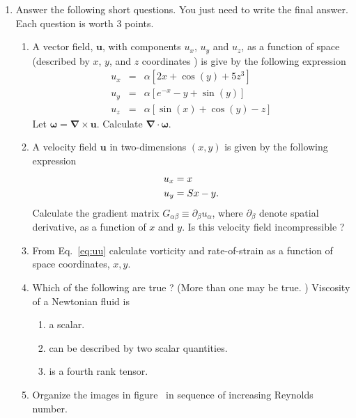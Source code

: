 \documentclass[12pt,a4paper]{article}
\def \oo {\bm{\omega}}
\def \curl {\bm{\nabla}\times}
\def \dive {\bm{\nabla}\cdot}
\newcommand{\bu}{\bm{u}}
\begin{document}
\begin{enumerate}

\item \label{prb1} Answer the following short questions. You just need to write the final answer. Each question is worth 3 points. 
  \begin{enumerate}
  \item A vector field, $\bu$, with components $u_x$, $u_y$ and $u_z$,  as a function  of
    space (described by $x$, $y$, and $z$ coordinates )
    is give by the following expression
    \begin{eqnarray}
      u_x &=& \alpha [2x + \cos(y) + 5z^3 ] \nonumber \\
      u_y &=& \alpha[ e^{-x} - y + \sin(y) ] \nonumber \\
      u_z &=& \alpha[ \sin(x) + \cos(y) -z ]
    \end{eqnarray}
   Let $\oo = \curl \bu$. Calculate $\dive \oo$. 
 \item A velocity field $\bu$ in two-dimensions $(x,y)$ is given by the following expression
   \begin{subequations}
     \begin{align}
     u_x &= x \\
     u_y &= Sx -y   \/.
     \end{align}
     \label{eq:uu}
   \end{subequations}
   Calculate the gradient matrix $ G_{\alpha\beta} \equiv \partial_{\beta}u_{\alpha}$, where
   $\partial_{\beta}$ denote spatial derivative, as a function of $x$ and $y$. Is this velocity
   field incompressible ? 
 \item From Eq.~\ref{eq:uu}  calculate vorticity and rate-of-strain as a function of
   space coordinates, $x,y$.
 \item Which of the following are true ? (More than one may be true. )
   Viscosity of a Newtonian fluid is
   \begin{enumerate}
   \item a scalar.
   \item can be described by two scalar quantities.
     \item is a fourth rank tensor. 
    \end{enumerate}
 \item Organize the images in figure~\label{fig:images} in
   sequence of increasing Reynolds number. 
   \begin{figure}

\end{figure}
\end{enumerate}
\end{enumerate}
\end{document}
